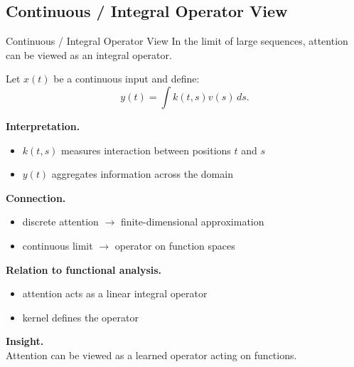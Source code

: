 \documentclass[aspectratio=169,11pt]{beamer}
\begin{document}
\subsection{Continuous / Integral Operator View}
\begin{frame}[t,allowframebreaks]{Continuous / Integral Operator View}
\small
In the limit of large sequences, attention can be viewed as an integral operator.

Let $x(t)$ be a continuous input and define:
\[
y(t) = \int k(t,s) v(s) \, ds.
\]

\textbf{Interpretation.}\\ \begin{itemize}
    \item $k(t,s)$ measures interaction between positions $t$ and $s$
    \item $y(t)$ aggregates information across the domain
\end{itemize}

\textbf{Connection.}\\ \begin{itemize}
    \item discrete attention $\rightarrow$ finite-dimensional approximation
    \item continuous limit $\rightarrow$ operator on function spaces
\end{itemize}

\textbf{Relation to functional analysis.}\\ \begin{itemize}
    \item attention acts as a linear integral operator
    \item kernel defines the operator
\end{itemize}

\textbf{Insight.}\\ Attention can be viewed as a learned operator acting on functions.
\end{frame}
\end{document}
